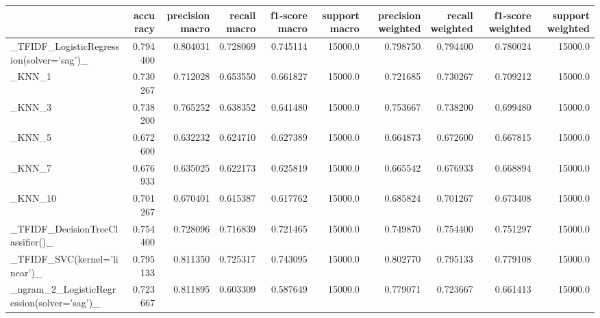 \begin{tabular}{lrrrrrrrrr}
\toprule
{} &  accuracy &  precision macro &  recall macro &  f1-score macro &  support macro &  precision weighted &  recall weighted &  f1-score weighted &  support weighted \\
\midrule
\_TFIDF\_LogisticRegression(solver='sag')\_           &  0.794400 &         0.804031 &      0.728069 &        0.745114 &        15000.0 &            0.798750 &         0.794400 &           0.780024 &           15000.0 \\
\_KNN\_1                                             &  0.730267 &         0.712028 &      0.653550 &        0.661827 &        15000.0 &            0.721685 &         0.730267 &           0.709212 &           15000.0 \\
\_KNN\_3                                             &  0.738200 &         0.765252 &      0.638352 &        0.641480 &        15000.0 &            0.753667 &         0.738200 &           0.699480 &           15000.0 \\
\_KNN\_5                                             &  0.672600 &         0.632232 &      0.624710 &        0.627389 &        15000.0 &            0.664873 &         0.672600 &           0.667815 &           15000.0 \\
\_KNN\_7                                             &  0.676933 &         0.635025 &      0.622173 &        0.625819 &        15000.0 &            0.665542 &         0.676933 &           0.668894 &           15000.0 \\
\_KNN\_10                                            &  0.701267 &         0.670401 &      0.615387 &        0.617762 &        15000.0 &            0.685824 &         0.701267 &           0.673408 &           15000.0 \\
\_TFIDF\_DecisionTreeClassifier()\_                   &  0.754400 &         0.728096 &      0.716839 &        0.721465 &        15000.0 &            0.749870 &         0.754400 &           0.751297 &           15000.0 \\
\_TFIDF\_SVC(kernel='linear')\_                       &  0.795133 &         0.811350 &      0.725317 &        0.743095 &        15000.0 &            0.802770 &         0.795133 &           0.779108 &           15000.0 \\
\_ngram\_2\_LogisticRegression(solver='sag')\_         &  0.723667 &         0.811895 &      0.603309 &        0.587649 &        15000.0 &            0.779071 &         0.723667 &           0.661413 &           15000.0 \\

\end{tabular}
